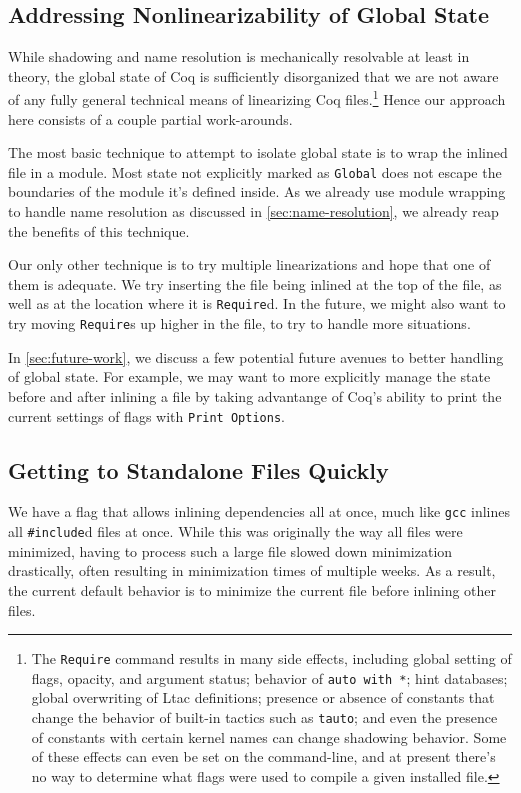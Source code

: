 \documentclass[a4paper,USenglish,cleveref,autoref,thm-restate]{lipics-v2021}
\begin{document}
\subsection{Addressing Nonlinearizability of Global State}\label{sec:linearize-global-state}
While shadowing and name resolution is mechanically resolvable at least in theory, the global state of Coq is sufficiently disorganized that we are not aware of any fully general technical means of linearizing Coq files.\footnote{%
The \texttt{Require} command results in many side effects, including global setting of flags, opacity, and argument status; behavior of \texttt{auto with *}; hint databases; global overwriting of Ltac definitions; presence or absence of constants that change the behavior of built-in tactics such as \texttt{tauto}; and even the presence of constants with certain kernel names can change shadowing behavior.
Some of these effects can even be set on the command-line, and at present there's no way to determine what flags were used to compile a given installed file.
}
Hence our approach here consists of a couple partial work-arounds.

The most basic technique to attempt to isolate global state is to wrap the inlined file in a module.
Most state not explicitly marked as \texttt{Global} does not escape the boundaries of the module it's defined inside.
As we already use module wrapping to handle name resolution as discussed in \autoref{sec:name-resolution}, we already reap the benefits of this technique.

Our only other technique is to try multiple linearizations and hope that one of them is adequate.
We try inserting the file being inlined at the top of the file, as well as at the location where it is \texttt{Require}d.
In the future, we might also want to try moving \texttt{Require}s up higher in the file, to try to handle more situations.

In \autoref{sec:future-work}, we discuss a few potential future avenues to better handling of global state.
For example, we may want to more explicitly manage the state before and after inlining a file by taking advantange of Coq's ability to print the current settings of flags with \texttt{Print Options}.

\subsection{Getting to Standalone Files Quickly}
We have a flag that allows inlining dependencies all at once, much like \texttt{gcc} inlines all \verb|#include|d files at once.
While this was originally the way all files were minimized, having to process such a large file slowed down minimization drastically, often resulting in minimization times of multiple weeks.
As a result, the current default behavior is to minimize the current file before inlining other files.
\end{document}
